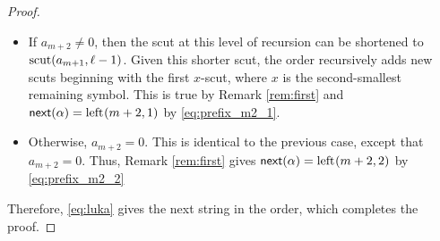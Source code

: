 \begin{proof}
\begin{itemize}[nosep]
    \item If $a_{m+2} \neq 0$, then the scut at this level of recursion can be shortened to $\operatorname{scut}(a_{m+1}, \ell-1)$.
    Given this shorter scut, the order recursively adds new scuts beginning with the first $x$-scut, where $x$ is the second-smallest remaining symbol.
    This is true by Remark \ref{rem:first} and $\mathsf{next}{(\alpha)} = \operatorname{left}_{}(m+2,1)$ by \eqref{eq:prefix_m2_1}.
    \item Otherwise, $a_{m+2} = 0$.
    This is identical to the previous case, except that $a_{m+2} = 0$.
    Thus, Remark \ref{rem:first} gives $\mathsf{next}{(\alpha)} = \operatorname{left}_{}(m+2,2)$ by \eqref{eq:prefix_m2_2}
\end{itemize}
Therefore, \eqref{eq:luka} gives the next string in the order, which completes the proof.
\end{proof}

